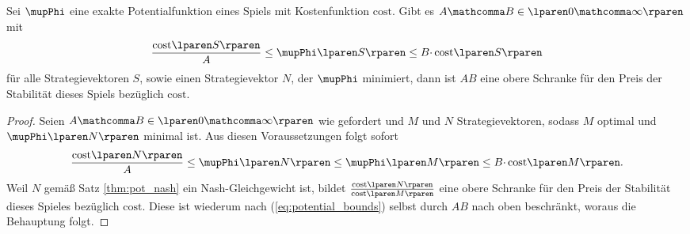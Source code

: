 \begin{satz}
\label{thm:potential_bounds}
  Sei $\mupPhi$ eine exakte Potentialfunktion eines Spiels mit Kostenfunktion
  $\mathrm{cost}$.
  Gibt es $A \mathcomma B \in \lparen 0 \mathcomma \infty \rparen$ mit
  \[
    \frac{\cost{S}}{A}
    \leq
    \mupPhi \lparen S \rparen
    \leq
    B \cdotp \cost{S}
  \]
  für alle Strategievektoren $S$,
  sowie einen Strategievektor $N$, der $\mupPhi$ minimiert,
  dann ist $AB$ eine obere Schranke für den Preis der Stabilität dieses Spiels
  bezüglich $\mathrm{cost}$.
\end{satz}

\begin{proof}
  Seien $A \mathcomma B \in \lparen 0 \mathcomma \infty \rparen$ wie gefordert
  und $M$ und $N$ Strategievektoren,
  sodass $M$ optimal und $\mupPhi \lparen N \rparen$ minimal ist.
  Aus diesen Voraussetzungen folgt sofort
  \begin{equation}
  \label{eq:potential_bounds}
    \frac{\cost{N}}{A}
    \leq
    \mupPhi \lparen N \rparen
    \leq
    \mupPhi \lparen M \rparen
    \leq
    B \cdotp \cost{M}.
  \end{equation}
  Weil $N$ gemäß Satz \ref{thm:pot_nash} ein Nash-Gleichgewicht ist,
  bildet $\frac{\cost{N}}{\cost{M}}$ eine obere Schranke
  für den Preis der Stabilität dieses Spieles bezüglich $\mathrm{cost}$.
  Diese ist wiederum nach (\ref{eq:potential_bounds})
  selbst durch $AB$ nach oben beschränkt,
  woraus die Behauptung folgt.
\end{proof}
